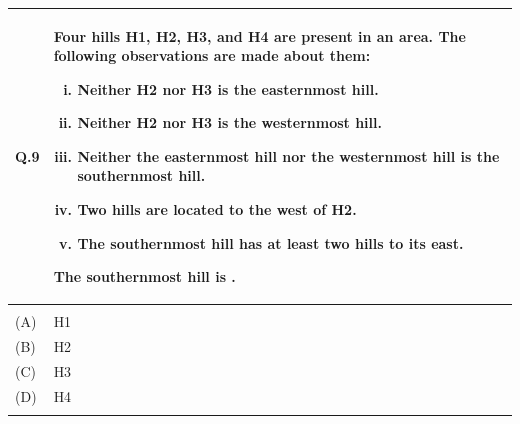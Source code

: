 \documentclass[12pt,a4paper]{article}
\begin{document}
\newpage

\begin{tabular}{|p{1cm}|p{12cm}|}
\hline
Q.9 & Four hills H1, H2, H3, and H4 are present in an area. The following observations
are made about them:
\begin{enumerate}[i.]
    \item Neither H2 nor H3 is the easternmost hill.
    \item Neither H2 nor H3 is the westernmost hill.
    \item Neither the easternmost hill nor the westernmost hill is the southernmost hill.
    \item Two hills are located to the west of H2.
    \item The southernmost hill has at least two hills to its east.
\end{enumerate}
The southernmost hill is \underline{\hspace{1.5cm}}. \\
\hline
& \rule{0pt}{0.8cm} \\
\hline
(A) & H1 \\
\hline
(B) & H2 \\
\hline
(C) & H3 \\
\hline
(D) & H4 \\
\hline
& \rule{0pt}{0.8cm} \\
\hline
\end{tabular}

\vspace{1em}
\end{document}
